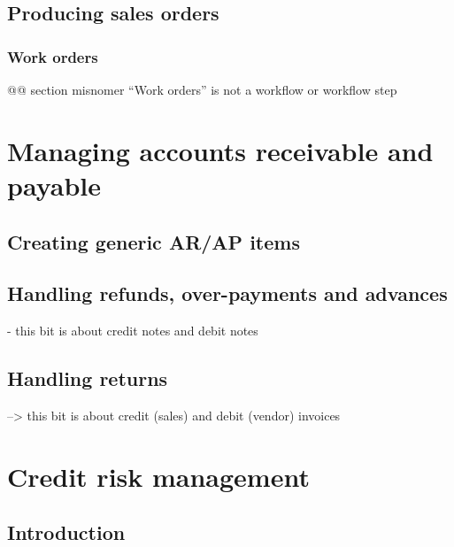 \section{Producing sales orders}
\label{sec-business-processes-manufacturing-producing-orders}

\subsection{Work orders}
\label{sec-business-processes-manufacturing-work-orders}

@@ section misnomer ``Work orders'' is not a workflow or workflow step

\chapter{Managing accounts receivable and payable}
\label{cha-business-processes-managing-ar/ap}

\section{Creating generic AR/AP items}
\label{sec-business-processes-managing-ar/ap-item-creation}

\section{Handling refunds, over-payments and advances}
\label{sec-business-processes-managing-ar/ap-overpayments}

- this bit is about credit notes and debit notes

\section{Handling returns}
\label{sec-business-processes-managing-ar/ap-returns}

--> this bit is about credit (sales) and debit (vendor) invoices

\chapter{Credit risk management}
\label{cha-credit-risk-management}

\section{Introduction}
\label{sec-credit-risk-management-introduction}


